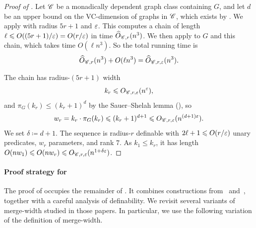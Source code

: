 \begin{proof}[Proof of ]
  Let $\mathscr C$ be a monadically dependent graph class containing $G$, and let $d$ be an upper bound on the VC-dimension of graphs in $\mathscr C$, which exists by .
  We apply  with radius $5r+1$ and $\varepsilon$.
  This computes a chain of length $\ell\leqslant O((5r+1)/\varepsilon)=O(r/\varepsilon)$ in time $\widehat O_{\mathscr C,r}(n^3)$.
  We then apply  to $G$ and this chain, which takes time $O(\ell n^3)$.
  So the total running time is
  \[
    \widehat O_{\mathscr C,r}(n^3)+O(\ell n^3)
    =\widehat O_{\mathscr C,r,\varepsilon}(n^3).
  \]
  

  The chain has radius-$(5r+1)$ width \[k_r\leqslant O_{\mathscr C,r,\varepsilon}(n^\varepsilon),\] and $\pi_G(k_r)\le(k_r+1)^d$
  by the Sauer--Shelah lemma (), so
  \[
    w_r=k_r\cdot\pi_G(k_r)\leqslant(k_r+1)^{d+1}\leqslant O_{\mathscr C,r,\varepsilon}(n^{(d+1)\varepsilon}).
  \]
  We set $\delta\coloneqq d+1$.
  The sequence is radius-$r$ definable with $2\ell+1\leqslant O(r/\varepsilon)$ unary predicates, $w_r$ parameters, and rank $7$.
  As $k_1\le k_r$, it has length $O(nw_1)\leqslant O(nw_r)\leqslant O_{\mathscr C,r,\varepsilon}(n^{1+\delta\varepsilon})$.
\end{proof}


\paragraph{Proof strategy for \texorpdfstring{}{the technical lemma}}\label{sec:defseq-lemma-strategy}

The proof of  
occupies the remainder of .
It combines constructions from~\cite{drabik2026variants} and~\cite{mw-stoc}, together with a careful analysis of definability.
We revisit several variants of merge-width studied in those papers.
In particular, we use the following variation of the definition of merge-width.

